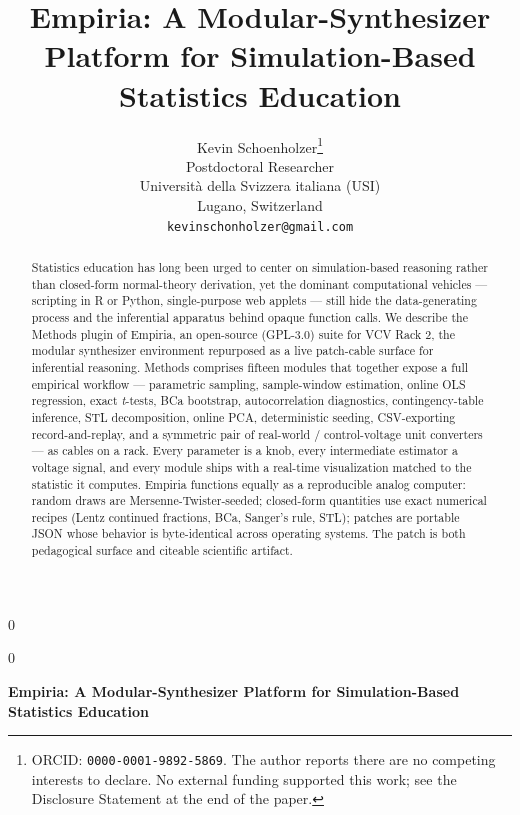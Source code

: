 \documentclass[12pt]{article}
\newcommand{\anon}{0}
\begin{document}
\def\spacingset#1{\renewcommand{\baselinestretch}{#1}\small\normalsize}
\spacingset{1}


\anon
{
  \title{\bf Empiria: A Modular-Synthesizer Platform for Simulation-Based Statistics Education}
  \author{Kevin Schoenholzer\thanks{ORCID: \texttt{0000-0001-9892-5869}. The author reports there are no competing interests to declare. No external funding supported this work; see the Disclosure Statement at the end of the paper.} \\
    Postdoctoral Researcher \\
    Universit\`a della Svizzera italiana (USI) \\
    Lugano, Switzerland \\
    \texttt{kevinschonholzer@gmail.com}}
  \maketitle
} \fi

\anon
{
  \bigskip
  \bigskip
  \bigskip
  \begin{center}
    {\LARGE\bf Empiria: A Modular-Synthesizer Platform for Simulation-Based Statistics Education}
  \end{center}
  \medskip
} \fi

\bigskip
\begin{abstract}
Statistics education has long been urged to center on simulation-based
reasoning rather than closed-form normal-theory derivation, yet the
dominant computational vehicles --- scripting in R or Python,
single-purpose web applets --- still hide the data-generating process
and the inferential apparatus behind opaque function calls. We describe
the Methods plugin of Empiria, an open-source (GPL-3.0) suite for VCV
Rack 2, the modular synthesizer environment repurposed as a live
patch-cable surface for inferential reasoning. Methods comprises fifteen
modules that together expose a full empirical workflow --- parametric
sampling, sample-window estimation, online OLS regression, exact
\textit{t}-tests, BCa bootstrap, autocorrelation diagnostics,
contingency-table inference, STL decomposition, online PCA,
deterministic seeding, CSV-exporting record-and-replay, and a symmetric
pair of real-world / control-voltage unit converters --- as cables on a
rack. Every parameter is a knob, every intermediate estimator a voltage
signal, and every module ships with a real-time visualization matched to
the statistic it computes. Empiria functions equally as a reproducible
analog computer: random draws are Mersenne-Twister-seeded; closed-form
quantities use exact numerical recipes (Lentz continued fractions, BCa,
Sanger's rule, STL); patches are portable JSON whose behavior is
byte-identical across operating systems. The patch is both pedagogical
surface and citeable scientific artifact.
\end{abstract}
\end{document}
